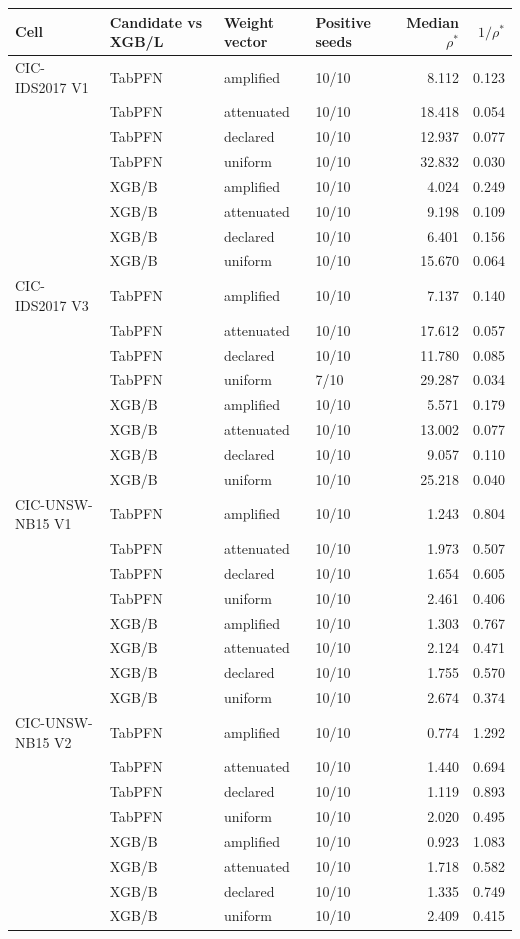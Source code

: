 \begin{tabular}{@{}llllrr@{}}
\toprule
Cell & Candidate vs XGB/L & Weight vector & Positive seeds & Median $\rho^*$ & $1/\rho^*$ \\
\midrule
CIC-IDS2017 V1 & TabPFN & amplified & 10/10 & 8.112 & 0.123 \\
 & TabPFN & attenuated & 10/10 & 18.418 & 0.054 \\
 & TabPFN & declared & 10/10 & 12.937 & 0.077 \\
 & TabPFN & uniform & 10/10 & 32.832 & 0.030 \\
 & XGB/B & amplified & 10/10 & 4.024 & 0.249 \\
 & XGB/B & attenuated & 10/10 & 9.198 & 0.109 \\
 & XGB/B & declared & 10/10 & 6.401 & 0.156 \\
 & XGB/B & uniform & 10/10 & 15.670 & 0.064 \\
\addlinespace
CIC-IDS2017 V3 & TabPFN & amplified & 10/10 & 7.137 & 0.140 \\
 & TabPFN & attenuated & 10/10 & 17.612 & 0.057 \\
 & TabPFN & declared & 10/10 & 11.780 & 0.085 \\
 & TabPFN & uniform & 7/10 & 29.287 & 0.034 \\
 & XGB/B & amplified & 10/10 & 5.571 & 0.179 \\
 & XGB/B & attenuated & 10/10 & 13.002 & 0.077 \\
 & XGB/B & declared & 10/10 & 9.057 & 0.110 \\
 & XGB/B & uniform & 10/10 & 25.218 & 0.040 \\
\addlinespace
CIC-UNSW-NB15 V1 & TabPFN & amplified & 10/10 & 1.243 & 0.804 \\
 & TabPFN & attenuated & 10/10 & 1.973 & 0.507 \\
 & TabPFN & declared & 10/10 & 1.654 & 0.605 \\
 & TabPFN & uniform & 10/10 & 2.461 & 0.406 \\
 & XGB/B & amplified & 10/10 & 1.303 & 0.767 \\
 & XGB/B & attenuated & 10/10 & 2.124 & 0.471 \\
 & XGB/B & declared & 10/10 & 1.755 & 0.570 \\
 & XGB/B & uniform & 10/10 & 2.674 & 0.374 \\
\addlinespace
CIC-UNSW-NB15 V2 & TabPFN & amplified & 10/10 & 0.774 & 1.292 \\
 & TabPFN & attenuated & 10/10 & 1.440 & 0.694 \\
 & TabPFN & declared & 10/10 & 1.119 & 0.893 \\
 & TabPFN & uniform & 10/10 & 2.020 & 0.495 \\
 & XGB/B & amplified & 10/10 & 0.923 & 1.083 \\
 & XGB/B & attenuated & 10/10 & 1.718 & 0.582 \\
 & XGB/B & declared & 10/10 & 1.335 & 0.749 \\
 & XGB/B & uniform & 10/10 & 2.409 & 0.415 \\
\bottomrule
\end{tabular}
